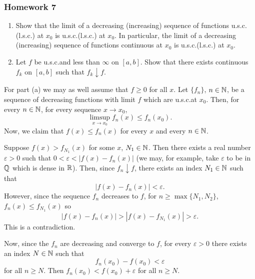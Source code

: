 \subsubsection{Homework 7}
\setcounter{exercise}{0}
\setcounter{equation}{0}

\begin{problem}
  \hfill
  \begin{enumerate}[label=(\alph*),noitemsep]
  \item Show that the limit of a decreasing (increasing) sequence of
    functions u.s.c.\@ (l.s.c.) at $x_0$ is u.s.c.\@ (l.s.c.) at $x_0$. In
    particular, the limit of a decreasing (increasing) sequence of
    functions continuous at $x_0$ is u.s.c.\@ (l.s.c.) at $x_0$.
  \item Let $f$ be u.s.c.\@ and less than $\infty$ on $[a,b]$. Show that there
    exists continuous $f_k$ on $[a,b]$ such that $f_k\downarrow f$.
  \end{enumerate}
\end{problem}
\begin{solution}
  For part (a) we may as well assume that $f\geq 0$ for all $x$. Let
  $\{f_n\}$, $n\in\mathbb{N}$, be a sequence of decreasing functions with limit
  $f$ which are u.s.c.\@ at $x_0$. Then, for every $n\in\mathbb{N}$, for every
  sequence $x\to x_0$,
  \[
    \limsup_{x\to x_0}f_n(x)\leq f_n(x_0).
  \]
  Now, we claim that $f(x)\leq f_n(x)$ for every $x$ and every $n\in\mathbb{N}$.
  {\begin{subproof}
    Suppose $f(x)>f_{N_1}(x)$ for some $x$, $N_1\in\mathbb{N}$. Then there exists
    a real number $\varepsilon>0$ such that $0<\varepsilon<|f(x)-f_n(x)|$ (we
    may, for example, take $\varepsilon$ to be in $\mathbb{Q}$ which is dense in
    $\mathbb{R}$). Then, since $f_n\downarrow f$, there exists an index
    $N_1\in\mathbb{N}$ such that
    \[
      |f(x)-f_n(x)|<\varepsilon.
    \]
    However, since the sequence $f_n$ decreases to $f$, for
    $n\geq\max\{N_1,N_2\}$, $f_n(x)\leq f_{N_1}(x)$ so
    \[
      |f(x)-f_n(x)|>|f(x)-f_{N_1}(x)|>\varepsilon.
    \]
    This is a contradiction.
  \end{subproof}}\noindent Now, since the $f_n$ are decreasing and converge
to $f$, for every $\varepsilon>0$ there exists an index $N\in\mathbb{N}$ such
that
  \[
    f_n(x_0)-f(x_0)<\varepsilon
  \]
  for all $n\geq N$. Then $f_n(x_0)<f(x_0)+\varepsilon$ for all $n\geq N$.
\end{solution}

